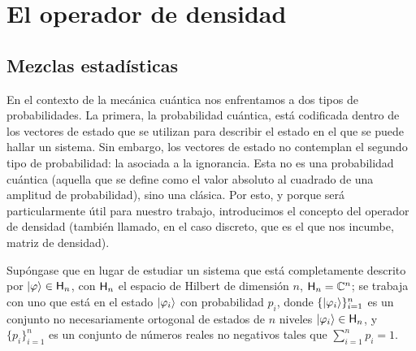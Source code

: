 \section{El operador de densidad}

\subsection{Mezclas estadísticas}


En el contexto de la mecánica cuántica nos enfrentamos a dos tipos de probabilidades. La primera, la probabilidad cuántica, está codificada dentro de los vectores de estado que se utilizan para describir el estado en el que se puede hallar un sistema. Sin embargo, los vectores de estado no contemplan el segundo tipo de probabilidad: la asociada a la ignorancia. Esta no es una probabilidad cuántica (aquella que se define como el valor absoluto al cuadrado de una amplitud de probabilidad), sino una clásica. Por esto, y porque será particularmente útil para nuestro trabajo, introducimos el concepto del operador de densidad (también llamado, en el caso discreto, que es el que nos incumbe, matriz de densidad).


Supóngase que en lugar de estudiar un sistema que está completamente descrito por $\ket{\varphi}\in{\sf H}_{n}$, con ${\sf H}_{n}$ el espacio de Hilbert de dimensión $n$, \ie{} ${\sf H}_{n}=\mathbb{C}^{n}$; se trabaja con uno que está en el estado $\ket{\varphi_{i}}$ con probabilidad $p_{i}$, donde $\{\ket{\varphi_{i}}\}_{i=1}^n$ es un conjunto no necesariamente ortogonal de estados de $n$ niveles $\ket{\varphi_{i}}\in{\sf H}_{n}$, y $\{p_{i}\}_{i=1}^n$ es un conjunto de números reales no negativos tales que $\sum_{i=1}^n p_{i}=1$.


